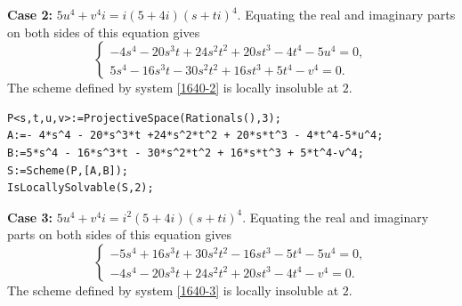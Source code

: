 \documentclass[a4paper,12pt,english,reqno]{amsart}
\begin{document}
{\bf Case 2:} $5u^4+v^4i=i(5+4i)(s+ti)^4$. Equating the real and imaginary parts on both sides of this equation gives
\begin{equation}\label{1640-2}
\begin{cases}
-4s^4 - 20s^3t + 24s^2t^2 + 20st^3 - 4t^4 - 5u^4=0,\\
5s^4 - 16s^3t - 30s^2t^2 + 16st^3 + 5t^4 - v^4=0.
\end{cases}
\end{equation}
The scheme defined by system \eqref{1640-2} is locally insoluble at $2$.


\begin{lstlisting}
P<s,t,u,v>:=ProjectiveSpace(Rationals(),3);
A:=- 4*s^4 - 20*s^3*t +24*s^2*t^2 + 20*s*t^3 - 4*t^4-5*u^4;
B:=5*s^4 - 16*s^3*t - 30*s^2*t^2 + 16*s*t^3 + 5*t^4-v^4;
S:=Scheme(P,[A,B]);
IsLocallySolvable(S,2);
\end{lstlisting}

{\bf Case 3:} $5u^4+v^4i=i^2(5+4i)(s+ti)^4$. Equating the real and imaginary parts on both sides of this equation gives
\begin{equation}\label{1640-3}
\begin{cases}
-5s^4 + 16s^3t + 30s^2t^2 - 16st^3 - 5t^4 - 5u^4=0,\\
-4s^4 - 20s^3t + 24s^2t^2 + 20st^3 - 4t^4 - v^4=0.
\end{cases}
\end{equation}
The scheme defined by system \eqref{1640-3} is locally insoluble at $2$.

\end{document}
